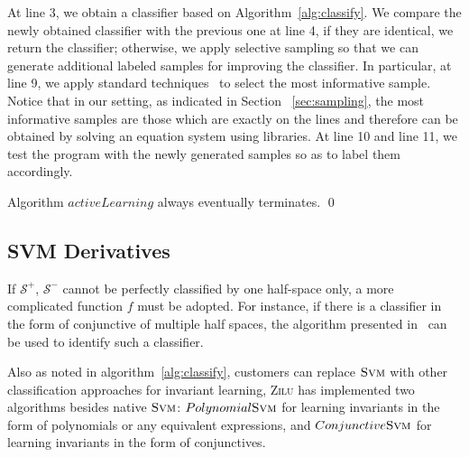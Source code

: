 At line 3, we obtain a classifier based on Algorithm~\ref{alg:classify}. 
We compare the newly obtained classifier with the previous one at line 4, if they are identical, we return the classifier; 
otherwise, we apply selective sampling so that we can generate additional labeled samples for improving the classifier. 
In particular, at line 9, we apply standard techniques~\cite{DBLP:conf/icml/SchohnC00} to select the most informative sample. 
Notice that in our setting, as indicated in Section ~\ref{sec:sampling}, the most informative samples are those which are exactly on the lines 
and therefore can be obtained by solving an equation system using libraries. 
At line 10 and line 11, we test the program with the newly generated samples so as to label them accordingly.


\begin{proposition}
Algorithm $activeLearning$ always eventually terminates. \hfill \qed
\end{proposition}


\subsection{SVM Derivatives}
\label{subsec:svm:derivatives}
If $\mathcal{S}^+$, $\mathcal{S}^-$ cannot be perfectly classified by one half-space only, 
a more complicated function $f$ must be adopted. 
For instance, if there is a classifier in the form of conjunctive of multiple half spaces, 
the algorithm presented in~\cite{sharma2012interpolants} can be used to identify such a classifier.

Also as noted in algorithm~\ref{alg:classify}, customers can replace $\textsc{Svm}$ with other classification approaches for invariant learning,
\textsc{Zilu} has implemented two algorithms besides native $\textsc{Svm}$: 
$Polynomial \textsc{Svm}$ for learning invariants in the form of polynomials or any equivalent expressions,
and $Conjunctive \textsc{Svm}$ for learning invariants in the form of conjunctives.

